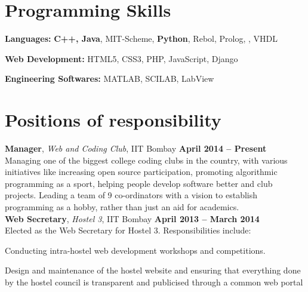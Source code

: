 \documentclass[margin,11pt]{resume}
\begin{document}
\begin{resume}
\section{\mysidestyle Programming Skills}
\begin{list2}
\item \textbf{Languages:} \textbf{C++, Java}, MIT-Scheme, \textbf{Python}, Rebol, Prolog, \LaTeXe{}, VHDL
\item \textbf{Web Development:} HTML5, CSS3, PHP, JavaScript, Django
\item \textbf{Engineering Softwares:} MATLAB, SCILAB, LabView
\end{list2}

\section{\mysidestyle Positions of responsibility}
\textbf{Manager}, \textsl{Web and Coding Club}, IIT Bombay \hfill \textbf{April 2014 -- Present}\\
Managing one of the biggest college coding clubs in the country, with various initiatives like increasing open source participation, promoting algorithmic programming as a sport, helping people develop software better and club projects. Leading a team of 9 co-ordinators with a vision to establish programming as a hobby, rather than just an aid for academics.
\vspace{2mm}\\
\textbf{Web Secretary}, \textsl{Hostel 3}, IIT Bombay \hfill \textbf{April 2013 -- March 2014}\\
Elected as the Web Secretary for Hostel 3. Responsibilities include:
\begin{list2}
\item Conducting intra-hostel web development workshops and competitions.
\item Design and maintenance of the hostel website and ensuring that everything done by the hostel council is transparent and publicised through a common web portal
\end{list2}



\end{resume}
\end{document}
